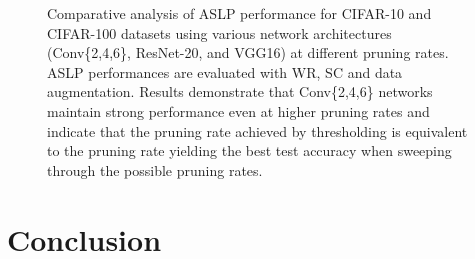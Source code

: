 \begin{figure}[htbp]
  \centering
    \caption{Comparative analysis of \ac{ASLP} performance for CIFAR-10 and CIFAR-100
    datasets using various network architectures (Conv\{2,4,6\}, ResNet-20, and
    VGG16) at different pruning rates. \ac{ASLP} performances are evaluated with
    \ac{WR}, \ac{SC} and data augmentation. Results demonstrate that
    Conv\{2,4,6\} networks maintain strong performance even at higher pruning
    rates and indicate that the pruning rate achieved by thresholding is
    equivalent to the pruning rate yielding the best test accuracy when sweeping
    through the possible pruning rates.}
  \label{fig:chap2:sparsity_impact}
\end{figure}


\section{Conclusion}\label{sec:chap2:conclusion}

